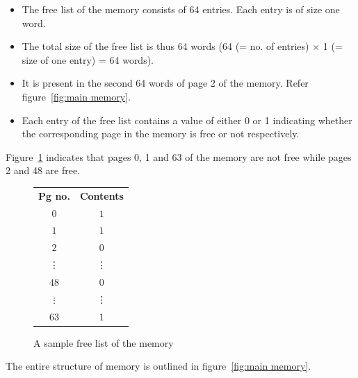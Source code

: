 \begin{itemize}
	\item The free list of the memory consists of 64 entries. Each entry is of size one word.
	\item The total size of the free list is thus 64 words (64 (= no. of entries) $\times$ 1 (= size of one entry) = 64 words).
	\item It is present in the second 64 words of page 2 of the memory. Refer figure~\ref{fig:main memory}.
	\item Each entry of the free list contains a value of either 0 or 1 indicating whether the corresponding page in the memory is free or not respectively.
\end{itemize}

\begin{example} 
	Figure~\ref{fig:mem_free_list} indicates that pages 0, 1 and 63 of the memory are not free while pages 2 and 48 are free.
\end{example}

\begin{figure}[htp!] \small
	\centering
	\begin{tabular}{c|c|}
		\textbf{Pg no.} & \textbf{Contents} \\ \cline{2-2}
		$0$ & $1$ \\ \cline{2-2}
		$1$ & $1$ \\ \cline{2-2}
		$2$ & $0$ \\ \cline{2-2}
		\vdots & \vdots \\ \cline{2-2}
		$48$ & $0$ \\ \cline{2-2}
		$\vdots$ & \vdots \\ \cline{2-2}
		$63$ & $1$ \\ \cline{2-2}
	\end{tabular}
	\caption{A sample free list of the memory}
	\label{fig:mem_free_list}
\end{figure}

The entire structure of memory is outlined in figure~\ref{fig:main memory}.
